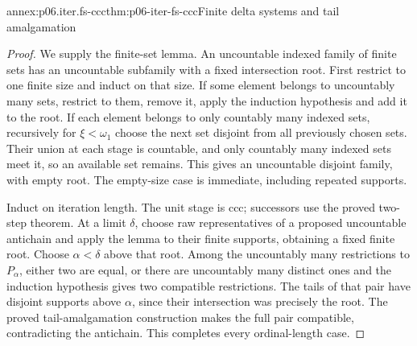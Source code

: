 \begin{annexitem}{annex:p06.iter.fs-ccc}{thm:p06-iter-fs-ccc}{Finite delta systems and tail amalgamation}
\begin{proof}
We supply the finite-set lemma. An uncountable indexed family of finite
sets has an uncountable subfamily with a fixed intersection root. First
restrict to one finite size and induct on that size. If some element
belongs to uncountably many sets, restrict to them, remove it, apply
the induction hypothesis and add it to the root. If each element belongs
to only countably many indexed sets, recursively for \(\xi<\omega_1\)
choose the next set disjoint from all previously chosen sets. Their
union at each stage is countable, and only countably many indexed sets
meet it, so an available set remains. This gives an uncountable disjoint
family, with empty root. The empty-size case is immediate, including
repeated supports.

Induct on iteration length. The unit stage is ccc; successors use the
proved two-step theorem. At a limit \(\delta\), choose raw representatives
of a proposed uncountable antichain and apply the lemma to their finite
supports, obtaining a fixed finite root. Choose \(\alpha<\delta\)
above that root. Among the uncountably many restrictions to \(P_\alpha\),
either two are equal, or there are uncountably many distinct ones and
the induction hypothesis gives two compatible restrictions. The tails
of that pair have disjoint supports above \(\alpha\), since their
intersection was precisely the root. The proved tail-amalgamation
construction makes the full pair compatible, contradicting the
antichain. This completes every ordinal-length case.
\end{proof}
\end{annexitem}


